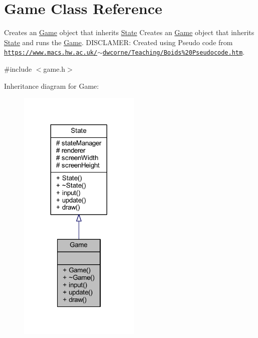 \hypertarget{class_game}{\section{Game Class Reference}
\label{class_game}
}


Creates an \hyperlink{class_game}{Game} object that inherits \hyperlink{class_state}{State} Creates an \hyperlink{class_game}{Game} object that inherits \hyperlink{class_state}{State} and runs the \hyperlink{class_game}{Game}. D\+I\+S\+C\+L\+A\+M\+E\+R\+: Created using Pseudo code from \href{https://www.macs.hw.ac.uk/~dwcorne/Teaching/Boids%20Pseudocode.htm}{\tt https\+://www.\+macs.\+hw.\+ac.\+uk/$\sim$dwcorne/\+Teaching/\+Boids\%20\+Pseudocode.\+htm}.  




{\ttfamily \#include $<$game.\+h$>$}



Inheritance diagram for Game\+:\nopagebreak
\begin{figure}[H]
\begin{center}
\leavevmode
\includegraphics[width=164pt]{class_game__inherit__graph}
\end{center}
\end{figure}


